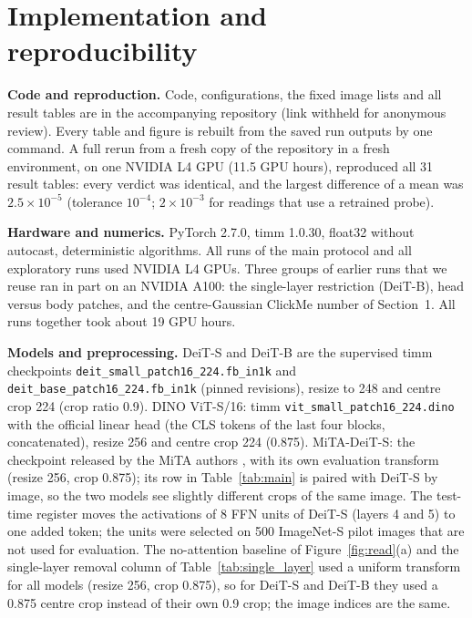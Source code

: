 \appendix
\setcounter{topnumber}{4}\setcounter{totalnumber}{6}
\renewcommand{\topfraction}{0.95}\renewcommand{\textfraction}{0.05}\renewcommand{\floatpagefraction}{0.75}

\FloatBarrier
\section{Implementation and reproducibility}
\label{app:impl}

\textbf{Code and reproduction.} Code, configurations, the fixed image lists and all result tables are in the accompanying repository (link withheld for anonymous review). Every table and figure is rebuilt from the saved run outputs by one command. A full rerun from a fresh copy of the repository in a fresh environment, on one NVIDIA L4 GPU (11.5 GPU hours), reproduced all 31 result tables: every verdict was identical, and the largest difference of a mean was $2.5\times10^{-5}$ (tolerance $10^{-4}$; $2\times10^{-3}$ for readings that use a retrained probe).

\textbf{Hardware and numerics.} PyTorch 2.7.0, timm 1.0.30, float32 without autocast, deterministic algorithms. All runs of the main protocol and all exploratory runs used NVIDIA L4 GPUs. Three groups of earlier runs that we reuse ran in part on an NVIDIA A100: the single-layer restriction (DeiT-B), head versus body patches, and the centre-Gaussian ClickMe number of Section~1. All runs together took about 19 GPU hours.

\textbf{Models and preprocessing.}
DeiT-S and DeiT-B are the supervised timm checkpoints \nolinkurl{deit_small_patch16_224.fb_in1k} and \nolinkurl{deit_base_patch16_224.fb_in1k} (pinned revisions), resize to 248 and centre crop 224 (crop ratio 0.9).
DINO ViT-S/16: timm \nolinkurl{vit_small_patch16_224.dino} with the official linear head (the CLS tokens of the last four blocks, concatenated), resize 256 and centre crop 224 (0.875).
MiTA-DeiT-S: the checkpoint released by the MiTA authors \citep{wen2026}, with its own evaluation transform (resize 256, crop 0.875); its row in Table~\ref{tab:main} is paired with DeiT-S by image, so the two models see slightly different crops of the same image.
The test-time register \citep{jiang2025} moves the activations of 8 FFN units of DeiT-S (layers 4 and 5) to one added token; the units were selected on 500 ImageNet-S pilot images that are not used for evaluation.
The no-attention baseline of Figure~\ref{fig:read}(a) and the single-layer removal column of Table~\ref{tab:single_layer} used a uniform transform for all models (resize 256, crop 0.875), so for DeiT-S and DeiT-B they used a 0.875 centre crop instead of their own 0.9 crop; the image indices are the same.

